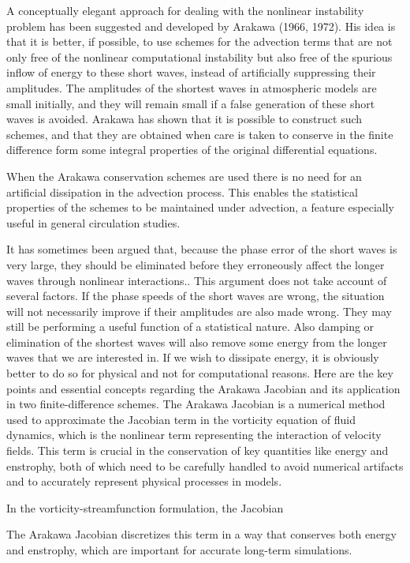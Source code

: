 A conceptually elegant approach for dealing with the nonlinear instability problem has been suggested and developed by Arakawa (1966, 1972). His idea is that it is better, if possible, to use schemes for the advection terms that are not only free of the nonlinear computa­tional instability but also free of the spurious inflow of energy to these short waves, instead of artificially suppress­ing their amplitudes. The amplitudes of the shortest waves in atmospheric models are small initially, and they will remain small if a false generation of these short waves is avoided. Arakawa has shown that it is possible to construct such schemes, and that they are obtained when care is taken to conserve in the finite difference form some integral properties of the original differential equa­tions.

When the Arakawa conservation schemes are used there is no need for an artificial dissipation in the advec­tion process. This enables the statistical properties of the schemes to be maintained under advection, a feature especially useful in general circulation studies.

It has sometimes been argued that, because the phase error of the short waves is very large, they should be eliminated before they erroneously affect the longer waves through nonlinear interactions.. This argument does not take account of several factors. If the phase speeds of the short waves are wrong, the situation will not necessar­ily improve if their amplitudes are also made wrong. They may still be performing a useful function of a statistical nature. Also damping or elimination of the shortest waves will also remove some energy from the longer waves that we are interested in. If we wish to dissipate energy, it is obviously better to do so for physical and not for computational reasons.
Here are the key points and essential concepts regarding the Arakawa Jacobian and its application in two finite-difference schemes. The Arakawa Jacobian is a numerical method used to approximate the Jacobian term in the vorticity equation of fluid dynamics, which is the nonlinear term representing the interaction of velocity fields. This term is crucial in the conservation of key quantities like energy and enstrophy, both of which need to be carefully handled to avoid numerical artifacts and to accurately represent physical processes in models.

In the vorticity-streamfunction formulation, the Jacobian

The Arakawa Jacobian discretizes this term in a way that conserves both energy and enstrophy, which are important for accurate long-term simulations.

